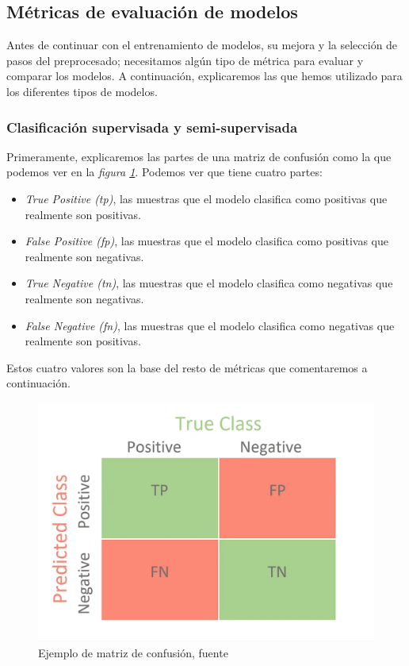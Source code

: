 \subsection{Métricas de evaluación de modelos}

Antes de continuar con el entrenamiento de modelos, su mejora y la selección de pasos del preprocesado; necesitamos algún tipo de métrica para evaluar y comparar los modelos. A continuación, explicaremos las que hemos utilizado para los diferentes tipos de modelos.

\subsubsection{Clasificación supervisada y semi-supervisada}

Primeramente, explicaremos las partes de una matriz de confusión como la que podemos ver en la \textit{figura \ref{fig:confusion-matrix-example}}. Podemos ver que tiene cuatro partes:

\begin{itemize}
    \item \textit{True Positive (tp)}, las muestras que el modelo clasifica como positivas que realmente son positivas.
    \item \textit{False Positive (fp)}, las muestras que el modelo clasifica como positivas que realmente son negativas.
    \item \textit{True Negative (tn)}, las muestras que el modelo clasifica como negativas que realmente son negativas.
    \item \textit{False Negative (fn)}, las muestras que el modelo clasifica como negativas que realmente son positivas.
\end{itemize}

Estos cuatro valores son la base del resto de métricas que comentaremos a continuación.

\begin{figure}[!ht]
    \centering
    \includegraphics[width=0.7\linewidth]{media/images/confusion-matrix-example.png}
    \caption{Ejemplo de matriz de confusión, fuente \cite{Confusio71:online}}
    \label{fig:confusion-matrix-example}
\end{figure}

